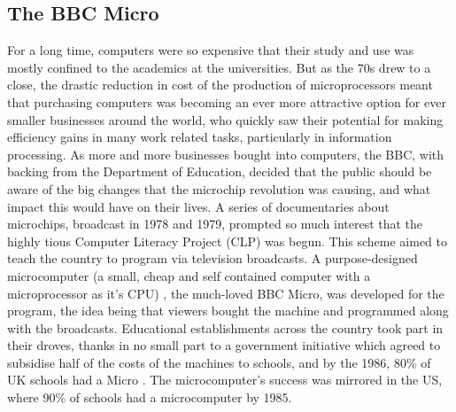 \documentclass[ %
                    author={Jonathan Rankin},
                supervisor={Dr. David May, Dr. Ian Holyer},
                    degree={MEng},
                     title={CodeTouch},
                  subtitle={A Revolutionary Way To Program Real Code On Touch Screen Devices},
                      type={enterprise},
                      year={2015 } ]{dissertation}
\begin{document}
\subsection{The BBC Micro}\label{sssec:bbcMicro}

For a long time, computers were so expensive that their study and use was mostly confined to the academics at the universities. But as the 70s drew to a close, the drastic reduction in cost of the production of microprocessors meant that purchasing computers was becoming an ever more attractive option for ever smaller businesses around the world, who quickly saw their potential for making efficiency gains in many work related tasks, particularly in information processing. As more and more businesses bought into computers, the BBC, with backing from the Department of Education, decided that the public should be aware of the big changes that the microchip revolution was causing, and what impact this would have on their lives. A series of documentaries about microchips, broadcast in 1978 and 1979, prompted so much interest that the highly tious Computer Literacy Project (CLP) was begun. This scheme aimed to teach the country to program via television broadcasts. A purpose-designed microcomputer (a small, cheap and self contained computer with a microprocessor as it's CPU) , the much-loved BBC Micro, was developed for the program, the idea being that viewers bought the machine and programmed along with the broadcasts. Educational establishments across the country took part in their droves, thanks in no small part to a government initiative which agreed to subsidise half of the costs of the machines to schools, and by the 1986, 80\% of UK schools had a Micro \cite{IIfASA}. The microcomputer's success was mirrored in the US, where 90\% of schools had a microcomputer by 1985\cite{IIfASA}.
\end{document}
